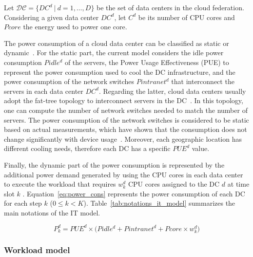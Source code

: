 Let $\mathcal{DC} = \{DC^d \ | \ d=1, \ldots, D\}$ be the set of data centers in the cloud federation. Considering a given data center $DC^d$, let $C^d$ be its number of CPU cores and $Pcore$ the energy used to power one core.


The power consumption of a cloud data center can be classified as static or dynamic~\cite{ahvar22_estimating_cloud_cons}. For the static part, the current model considers the idle power consumption $Pidle^d$ of the servers, the Power Usage Effectiveness (PUE) to represent the power consumption used to cool the DC infrastructure, and the power consumption of the network switches $Pintranet^d$ that interconnect the servers in each data center $DC^d$. Regarding the latter, cloud data centers usually adopt the fat-tree topology to interconnect servers in the DC~\cite{ahvar22_estimating_cloud_cons}. In this topology, one can compute the number of network switches needed to match the number of servers. The power consumption of the network switches is considered to be static based on actual measurements, which have shown that the consumption does not change significantly with device usage~\cite{Hlavacs2009_energy_network_devices}. Moreover, each geographic location has different cooling needs, therefore each DC has a specific $PUE^d$ value. 


Finally, the dynamic part of the power consumption is represented by the additional power demand generated by using the CPU cores in each data center to execute the workload that requires $ w^d_k$ CPU cores assigned to the DC $d$ at time slot $k$ . Equation~\eqref{eq:power_cons} represents the power consumption of each DC for each step $k$ ($0\leq k<K$).  Table~\ref{tab:notations_it_model} summarizes the main notations of the IT model.

\begin{equation} \label{eq:power_cons}
   P^d_k  = PUE^d \times \big( Pidle^d + Pintranet^d + Pcore \times w^d_k\big)
\end{equation}



\subsubsection{Workload model}
\label{sec:workload_model_ccgrid}

